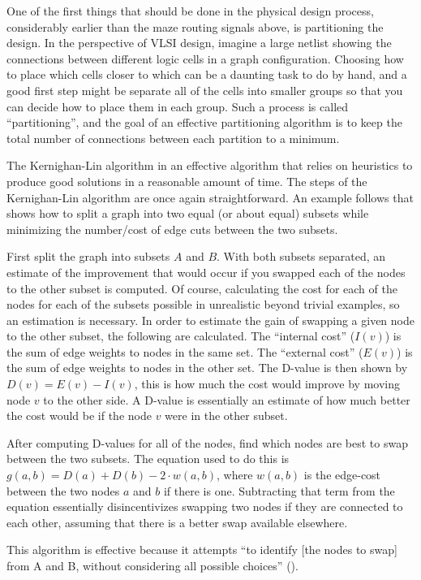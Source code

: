 
One of the first things that should be done in the physical
design process, considerably earlier than the maze routing
signals above, is partitioning the design. In the perspective
of VLSI design, imagine a large netlist showing the
connections between different logic cells in a graph
configuration. Choosing how to place which cells closer
to which can be a daunting task to do by hand, and a
good first step might be separate all of the cells into
smaller groups so that you can decide how to place them
in each group. Such a process is called ``partitioning'',
and the goal of an effective partitioning algorithm
is to keep the total number of connections between each
partition to a minimum.

The Kernighan-Lin algorithm in an effective algorithm
that relies on heuristics to produce good solutions
in a reasonable amount of time. The steps of the Kernighan-Lin
algorithm are once again straightforward. An example
follows that shows how to split a graph into two equal
(or about equal) subsets while minimizing the number/cost
of edge cuts between the two subsets.

First split the graph into subsets $A$ and $B$. With both
subsets separated, an estimate of the improvement that
would occur if you swapped each of the nodes to the
other subset is computed. Of course, calculating the
cost for each of the nodes for each of the subsets possible
in unrealistic beyond trivial examples, so an estimation
is necessary. In order to estimate the gain of swapping
a given node to the other subset, the following are
calculated. The ``internal cost'' ($I(v)$) is the sum
of edge weights to nodes in the same set. The ``external
cost'' ($E(v)$) is the sum of edge weights to nodes
in the other set. The D-value is then shown by $D(v)
= E(v) - I(v)$, this is how much the cost would improve
by moving node $v$ to the other side. A D-value is essentially
an estimate of how much better the cost would be if the
node $v$ were in the other subset.

After computing D-values for all of the nodes, find
which nodes are best to swap between the two subsets.
The equation used to do this is $g(a,b) = D(a) + D(b)
- 2 \cdot w(a,b)$, where $w(a,b)$ is the edge-cost between
the two nodes $a$ and $b$ if there is one. Subtracting
that term from the equation essentially disincentivizes
swapping two nodes if they are connected to each other, assuming
that there is a better swap available elsewhere.

This algorithm is effective because it attempts ``to
identify [the nodes to swap] from A and B, without considering
all possible choices'' (\cite{6771089}).
